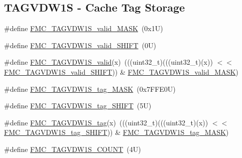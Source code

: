 \subsection*{T\+A\+G\+V\+D\+W1S -\/ Cache Tag Storage}
\begin{DoxyCompactItemize}
\item 
\#define \mbox{\hyperlink{group___f_m_c___register___masks_gaed37a62e513bc50a18cccf4cd8ee671e}{F\+M\+C\+\_\+\+T\+A\+G\+V\+D\+W1\+S\+\_\+valid\+\_\+\+M\+A\+SK}}~(0x1\+U)
\item 
\#define \mbox{\hyperlink{group___f_m_c___register___masks_ga2399e43fc56c8c9765ee4b259064eca0}{F\+M\+C\+\_\+\+T\+A\+G\+V\+D\+W1\+S\+\_\+valid\+\_\+\+S\+H\+I\+FT}}~(0\+U)
\item 
\#define \mbox{\hyperlink{group___f_m_c___register___masks_ga26c345d5afe91e6d581a7b2b9c773899}{F\+M\+C\+\_\+\+T\+A\+G\+V\+D\+W1\+S\+\_\+valid}}(x)~(((uint32\+\_\+t)(((uint32\+\_\+t)(x)) $<$$<$ \mbox{\hyperlink{group___f_m_c___register___masks_ga2399e43fc56c8c9765ee4b259064eca0}{F\+M\+C\+\_\+\+T\+A\+G\+V\+D\+W1\+S\+\_\+valid\+\_\+\+S\+H\+I\+FT}})) \& \mbox{\hyperlink{group___f_m_c___register___masks_gaed37a62e513bc50a18cccf4cd8ee671e}{F\+M\+C\+\_\+\+T\+A\+G\+V\+D\+W1\+S\+\_\+valid\+\_\+\+M\+A\+SK}})
\item 
\#define \mbox{\hyperlink{group___f_m_c___register___masks_ga45f190c0d7ee9c842a0e5f5bedd047d1}{F\+M\+C\+\_\+\+T\+A\+G\+V\+D\+W1\+S\+\_\+tag\+\_\+\+M\+A\+SK}}~(0x7\+F\+F\+E0\+U)
\item 
\#define \mbox{\hyperlink{group___f_m_c___register___masks_ga796e1287dc06a1ccce8dde2de6ec177e}{F\+M\+C\+\_\+\+T\+A\+G\+V\+D\+W1\+S\+\_\+tag\+\_\+\+S\+H\+I\+FT}}~(5\+U)
\item 
\#define \mbox{\hyperlink{group___f_m_c___register___masks_gaee2594ff5f366b6b15fbf97934a7096b}{F\+M\+C\+\_\+\+T\+A\+G\+V\+D\+W1\+S\+\_\+tag}}(x)~(((uint32\+\_\+t)(((uint32\+\_\+t)(x)) $<$$<$ \mbox{\hyperlink{group___f_m_c___register___masks_ga796e1287dc06a1ccce8dde2de6ec177e}{F\+M\+C\+\_\+\+T\+A\+G\+V\+D\+W1\+S\+\_\+tag\+\_\+\+S\+H\+I\+FT}})) \& \mbox{\hyperlink{group___f_m_c___register___masks_ga45f190c0d7ee9c842a0e5f5bedd047d1}{F\+M\+C\+\_\+\+T\+A\+G\+V\+D\+W1\+S\+\_\+tag\+\_\+\+M\+A\+SK}})
\item 
\#define \mbox{\hyperlink{group___f_m_c___register___masks_gaa50e4acf960e6e803502b657e9db83c5}{F\+M\+C\+\_\+\+T\+A\+G\+V\+D\+W1\+S\+\_\+\+C\+O\+U\+NT}}~(4\+U)
\end{DoxyCompactItemize}
